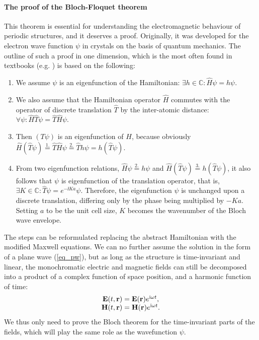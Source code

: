 \paragraph{The proof of the Bloch-Floquet theorem}%
This theorem is essential for understanding the electromagnetic behaviour of periodic structures, and it deserves a proof. Originally, it was developed for the electron wave function $\psi$ in crystals on the basis of quantum mechanics. The outline of such a proof in one dimension, which is the most often found in textbooks (e.g. \cite[p. 134]{ashcroft2005solid}) is based on the following:
\begin{enumerate}
 \item{We assume $\psi$ is an eigenfunction of the Hamiltonian: $\exists h\in \mathbb{C}: \hat H\psi = h\psi$.} 
 \item{We also assume that the Hamiltonian operator $\hat H$ commutes with the operator of discrete translation $\hat T$ by the inter-atomic distance: $\forall \psi: \hat H\hat T\psi = \hat T\hat H\psi$. } 
 \item{Then $(T\psi)$ is an eigenfunction of $H$, because obviously $\hat H(\hat T\psi) \stackrel{1.}{=} \hat T\hat H\psi \stackrel{2.}{=} \hat Th\psi = h(\hat T\psi)$.}
 \item{From two eigenfunction relations, $\hat H\psi\stackrel{2.}{=} h\psi$ and $\hat H(\hat T\psi) \stackrel{3.}{=} h(\hat T\psi)$, it also follows that $\psi$ is eigenfunction of the translation operator, that is,
$\exists K\in \mathbb{C}: \hat T\psi = e^{-\ii Ka}\psi$.  Therefore, the eigenfunction $\psi$ is unchanged upon a discrete translation, differing only by the phase being multiplied by $-Ka$. Setting $a$ to be the unit cell size, $K$ becomes the wavenumber of the Bloch wave envelope.
}
 \end{enumerate}
The steps can be reformulated replacing the abstract Hamiltonian with the modified Maxwell equations. We can no further assume the solution in the form of a plane wave (\ref{eq_pw}), but as long as the structure is time-invariant and linear, the monochromatic electric and magnetic fields can still be decomposed into a product of a complex function of space position, and a harmonic function of time:
\begin{equation} 
\begin{array}{cc}
\mathbf{E}(t, {\mathbf{r}}) = \mathbf{E}({\mathbf{r}}) e^{{\mathrm i} \omega t}, \\
\mathbf{H}(t, {\mathbf{r}}) = \mathbf{H}({\mathbf{r}}) e^{{\mathrm i} \omega t}. 
\end{array}
\label{eq_harmonic}\end{equation}
We thus only need to prove the Bloch theorem for the time-invariant parts of the fields, which will play the same role as the wavefunction $\psi$.

